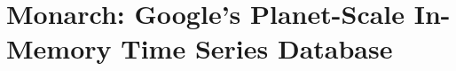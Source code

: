 \documentclass[12pt]{report}
\begin{document}








\chapter{Monarch: Google's Planet-Scale In-Memory Time Series Database}
















\end{document}
